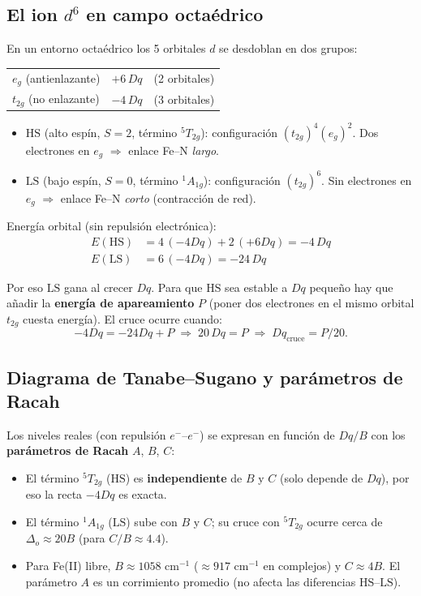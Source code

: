 \documentclass[11pt,a4paper]{article}
\newcommand{\HS}{\mathrm{HS}}
\newcommand{\LS}{\mathrm{LS}}
\newcommand{\Dq}{Dq}
\begin{document}
\subsection{El ion $d^6$ en campo octaédrico}

En un entorno octaédrico los 5 orbitales $d$ se desdoblan en dos grupos:

\begin{center}
\begin{tabular}{lcl}
$e_g$ (antienlazante) & $+6\,\Dq$ & (2 orbitales) \\
$t_{2g}$ (no enlazante) & $-4\,\Dq$ & (3 orbitales)
\end{tabular}
\end{center}

\begin{itemize}
\item \textbf{$\HS$} (alto espín, $S=2$, término ${}^5T_{2g}$):
  configuración $(t_{2g})^4(e_g)^2$. Dos electrones en $e_g$ $\Rightarrow$
  enlace Fe--N \emph{largo}.
\item \textbf{$\LS$} (bajo espín, $S=0$, término ${}^1A_{1g}$):
  configuración $(t_{2g})^6$. Sin electrones en $e_g$ $\Rightarrow$ enlace
  Fe--N \emph{corto} (contracción de red).
\end{itemize}

Energía orbital (sin repulsión electrónica):
\begin{align}
E(\HS) &= 4\,(-4\Dq) + 2\,(+6\Dq) = -4\,\Dq\\
E(\LS) &= 6\,(-4\Dq) = -24\,\Dq
\end{align}

Por eso $\LS$ gana al crecer $\Dq$. Para que $\HS$ sea estable a $\Dq$ pequeño hay
que añadir la \textbf{energía de apareamiento} $P$ (poner dos electrones en el
mismo orbital $t_{2g}$ cuesta energía). El cruce ocurre cuando:
\begin{equation}
-4\Dq = -24\Dq + P \;\Rightarrow\; 20\,\Dq = P \;\Rightarrow\; \Dq_{\mathrm{cruce}} = P/20 .
\end{equation}

\subsection{Diagrama de Tanabe--Sugano y parámetros de Racah}

Los niveles reales (con repulsión $e^-$--$e^-$) se expresan en función de
$\Dq/B$ con los \textbf{parámetros de Racah} $A$, $B$, $C$:
\begin{itemize}
\item El término ${}^5T_{2g}$ ($\HS$) es \textbf{independiente} de $B$ y $C$
  (solo depende de $\Dq$), por eso la recta $-4\Dq$ es exacta.
\item El término ${}^1A_{1g}$ ($\LS$) sube con $B$ y $C$; su cruce con
  ${}^5T_{2g}$ ocurre cerca de $\Delta_o \approx 20B$ (para $C/B \approx 4.4$).
\item Para Fe(II) libre, $B\approx 1058$ cm$^{-1}$ ($\approx 917$ cm$^{-1}$ en
  complejos) y $C\approx 4B$. El parámetro $A$ es un corrimiento promedio (no
  afecta las diferencias $\HS$--$\LS$).
\end{itemize}
\end{document}

